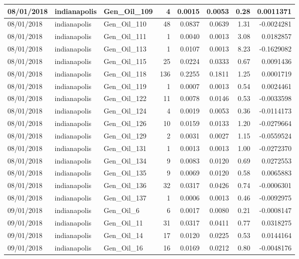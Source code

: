 \documentclass[
  letterpaper,
  DIV=11,
  numbers=noendperiod]{scrartcl}
\begin{document}
\begin{tabular}{l|l|l|r|r|r|r|r}
\hline
08/01/2018 & indianapolis & Gen\_Oil\_109 & 4 & 0.0015 & 0.0053 & 0.28 & 0.0011371\\
\hline
08/01/2018 & indianapolis & Gen\_Oil\_110 & 48 & 0.0837 & 0.0639 & 1.31 & -0.0024281\\
\hline
08/01/2018 & indianapolis & Gen\_Oil\_111 & 1 & 0.0040 & 0.0013 & 3.08 & 0.0182857\\
\hline
08/01/2018 & indianapolis & Gen\_Oil\_113 & 1 & 0.0107 & 0.0013 & 8.23 & -0.1629082\\
\hline
08/01/2018 & indianapolis & Gen\_Oil\_115 & 25 & 0.0224 & 0.0333 & 0.67 & 0.0091436\\
\hline
08/01/2018 & indianapolis & Gen\_Oil\_118 & 136 & 0.2255 & 0.1811 & 1.25 & 0.0001719\\
\hline
08/01/2018 & indianapolis & Gen\_Oil\_119 & 1 & 0.0007 & 0.0013 & 0.54 & 0.0024461\\
\hline
08/01/2018 & indianapolis & Gen\_Oil\_122 & 11 & 0.0078 & 0.0146 & 0.53 & -0.0033598\\
\hline
08/01/2018 & indianapolis & Gen\_Oil\_124 & 4 & 0.0019 & 0.0053 & 0.36 & -0.0114173\\
\hline
08/01/2018 & indianapolis & Gen\_Oil\_126 & 10 & 0.0159 & 0.0133 & 1.20 & -0.0279664\\
\hline
08/01/2018 & indianapolis & Gen\_Oil\_129 & 2 & 0.0031 & 0.0027 & 1.15 & -0.0559524\\
\hline
08/01/2018 & indianapolis & Gen\_Oil\_131 & 1 & 0.0013 & 0.0013 & 1.00 & -0.0272370\\
\hline
08/01/2018 & indianapolis & Gen\_Oil\_134 & 9 & 0.0083 & 0.0120 & 0.69 & 0.0272553\\
\hline
08/01/2018 & indianapolis & Gen\_Oil\_135 & 9 & 0.0069 & 0.0120 & 0.58 & 0.0065883\\
\hline
08/01/2018 & indianapolis & Gen\_Oil\_136 & 32 & 0.0317 & 0.0426 & 0.74 & -0.0006301\\
\hline
08/01/2018 & indianapolis & Gen\_Oil\_137 & 1 & 0.0006 & 0.0013 & 0.46 & -0.0092975\\
\hline
09/01/2018 & indianapolis & Gen\_Oil\_6 & 6 & 0.0017 & 0.0080 & 0.21 & -0.0008147\\
\hline
09/01/2018 & indianapolis & Gen\_Oil\_11 & 31 & 0.0317 & 0.0411 & 0.77 & 0.0318275\\
\hline
09/01/2018 & indianapolis & Gen\_Oil\_14 & 17 & 0.0120 & 0.0225 & 0.53 & 0.0144164\\
\hline
09/01/2018 & indianapolis & Gen\_Oil\_16 & 16 & 0.0169 & 0.0212 & 0.80 & -0.0048176\\

\end{tabular}
\end{document}
